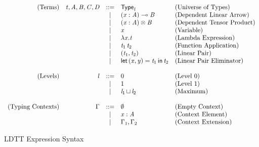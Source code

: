 
\begin{figure}
  \begin{center}
    \begin{math}
      \begin{array}{rrcll}
        \text{(Terms)} & \mathit{t}, \mathit{A}, \mathit{B}, \mathit{C}, \mathit{D}
         & ::= &  \mathsf{Type}_{ \mathit{l} }                    & \text{(Universe of Types)}\\
        &&  |  & (  \mathit{x}  :  \mathit{A}  )  \multimap  \mathit{B}           & \text{(Dependent Linear Arrow)}\\
        &&  |  & (  \mathit{x}  :  \mathit{A}  )  \otimes  \mathit{B}            & \text{(Dependent Tensor Product)}\\
        &&  |  & \mathit{x}                        & \text{(Variable)}\\
        &&  |  &  \lambda  \mathit{x}  .  \mathit{t}                      & \text{(Lambda Expression)}\\
        &&  |  & \mathit{t_{{\mathrm{1}}}} \, \mathit{t_{{\mathrm{2}}}}                    & \text{(Function Application)}\\
        &&  |  & (  \mathit{t_{{\mathrm{1}}}}  ,  \mathit{t_{{\mathrm{2}}}}  )                & \text{(Linear Pair)}\\
        &&  |  &  \mathsf{let}\,( \mathit{x} , \mathit{y} ) =  \mathit{t_{{\mathrm{1}}}} \,\mathsf{in}\, \mathit{t_{{\mathrm{2}}}}  & \text{(Linear Pair Eliminator)}\\
        \\
        \text{(Levels)} & \mathit{l} 
        & ::= & 0                  & \text{(Level $0$)}\\
        && |  & 1                  & \text{(Level $1$)}\\
        && |  &  \mathit{l_{{\mathrm{1}}}}  \mathop{\sqcup}  \mathit{l_{{\mathrm{2}}}}          & \text{(Maximum)}\\
        \\
        \text{(Typing Contexts)} & \Gamma 
        & ::= &  \emptyset                   & \text{(Empty Context)}\\
        && |  & \mathit{x}  :  \mathit{A}                & \text{(Context Element)}\\
        && |  & \Gamma_{{\mathrm{1}}}  ,  \Gamma_{{\mathrm{2}}}              & \text{(Context Extension)}\\
      \end{array}
    \end{math}
  \end{center}
  \caption{LDTT Expression Syntax}
  \label{fig:ldtt-syntax}
\end{figure}

